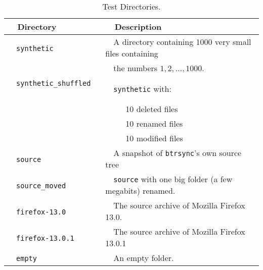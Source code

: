 \documentclass[11pt]{llncs}
\newcommand{\btrsync}{\texttt{btrsync}\xspace}
\begin{document}
\begin{table}
\begin{center}
\begin{tabular}{ll}\toprule
~~{\bf Directory}              ~~&~~{\bf Description}\\\midrule
~~{\tt synthetic}              ~~&~~A directory containing 1000 very small files containing~~\\
~~                             ~~&~~the numbers $1,2,\ldots,1000$. \\
~~{\tt synthetic\_shuffled}    ~~&~~{\tt synthetic} with:\\
                             ~~& ~~~~~10 deleted files\\
                             ~~& ~~~~~10 renamed files \\
                             ~~& ~~~~~10 modified files \\
~~{\tt source}                 ~~& ~~A snapshot of \btrsync's own source tree \\
~~{\tt source\_moved}          ~~& ~~{\tt source} with one big folder (a few megabits) renamed.~~\\
~~{\tt firefox-13.0}           ~~& ~~The source archive of Mozilla Firefox 13.0.\\
~~{\tt firefox-13.0.1}         ~~& ~~The source archive of Mozilla Firefox 13.0.1\\
~~{\tt empty}                  ~~& ~~An empty folder.\\\bottomrule
\end{tabular}\smallskip
  \caption{Test Directories.}
  \label{tab:benchdirec}
\end{center}
\end{table}
\end{document}

